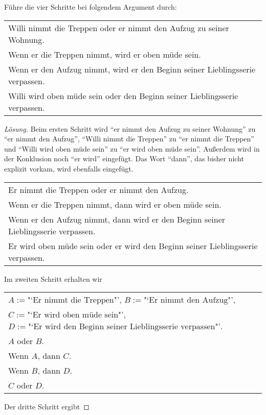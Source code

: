 \documentclass{zusammenfassung}
\begin{document}
\begin{aufgabe}
  Führe die vier Schritte bei folgendem Argument durch:

  \begin{tabular}{l}
    Willi nimmt die Treppen oder er nimmt den Aufzug zu seiner Wohnung.\\
    Wenn er die Treppen nimmt, wird er oben müde sein.\\
    Wenn er den Aufzug nimmt, wird er den Beginn seiner Lieblingsserie verpassen.\\
    \hline
    Willi wird oben müde sein oder den Beginn seiner Lieblingsserie verpassen.
  \end{tabular}

\end{aufgabe}
\begin{proof}[Lösung]
  Beim ersten Schritt wird "`er nimmt den Aufzug zu seiner Wohnung"' zu "`er nimmt den Aufzug"', "`Willi nimmt die Treppen"' zu
  "`er nimmt die Treppen"' und "`Willi wird oben müde sein"' zu "`er wird oben müde sein"'. Außerdem wird in der Konklusion noch
  "`er wird"' eingefügt. Das Wort "`dann"', das bisher nicht explizit vorkam, wird ebenfalls eingefügt.

  \begin{tabular}{l}
    Er nimmt die Treppen oder er nimmt den Aufzug.\\
    Wenn er die Treppen nimmt, dann wird er oben müde sein.\\
    Wenn er den Aufzug nimmt, dann wird er den Beginn seiner Lieblingsserie verpassen.\\
    \hline
    Er wird oben müde sein oder er wird den Beginn seiner Lieblingsserie verpassen.
  \end{tabular}

  Im zweiten Schritt erhalten wir

  \begin{tabular}{l}
    $A:=\text{"`Er nimmt die Treppen"'}$, $B:=\text{"`Er nimmt den Aufzug"'}$,\\
    $C:=\text{"`Er wird oben müde sein"'}$, $D:=\text{"`Er wird den Beginn seiner Lieblingsserie verpassen"'}$.\\[1ex]
    $A$ oder $B$.\\
    Wenn $A$, dann $C$.\\
    Wenn $B$, dann $D$.\\
    \hline
    $C$ oder $D$.
  \end{tabular}

  Der dritte Schritt ergibt


\end{proof}
\end{document}
